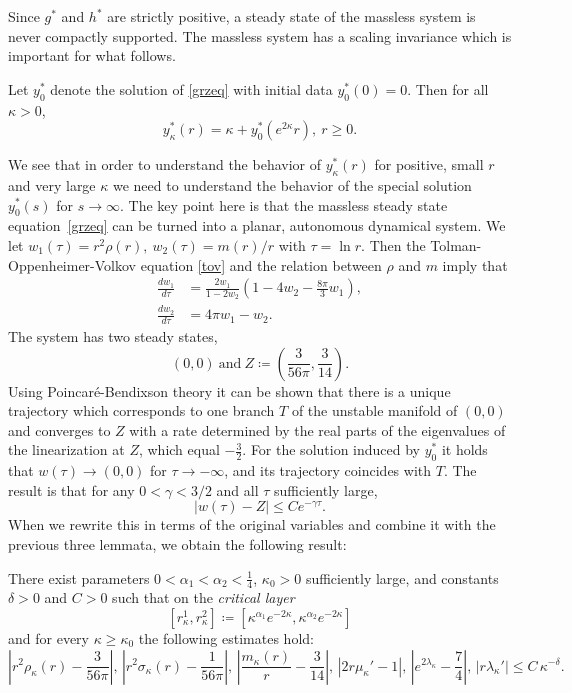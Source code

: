 \documentclass[11pt]{article}
\begin{document}
Since $g^\ast$ and $h^\ast$ are strictly positive,
a steady state of the massless system is never compactly supported.
The massless system has a scaling invariance which is important for
what follows.
%
\begin{lemma} \label{z-xi}
  Let $y^\ast_0$ denote the solution of \eqref{grzeq}
  with initial data $y^\ast_0(0)=0$.
  Then for all $\kappa >0$,
  \[
  y^\ast_\kappa(r) = \kappa + y^\ast_0(e^{2\kappa} r),\ r\geq 0 .
  \]
\end{lemma}
%
We see that in order to understand the behavior of $y^\ast_\kappa(r)$ for
positive, small $r$ and very large $\kappa$ we need to understand the behavior
of the special solution $y^\ast_0(s)$ for $s\to \infty$.
The key point here is that the massless steady state equation~\eqref{grzeq}
can be turned into a planar, autonomous dynamical system.
We let $w_1(\tau) = r^2 \rho(r),\ w_2(\tau)= m(r)/r$ with $\tau=\ln r$.
Then the Tolman-Oppenheimer-Volkov equation \eqref{tov} and the relation between
$\rho$ and $m$ imply that
\begin{align}
  \frac{d w_1}{d\tau}
  &=
  \frac{2 w_1}{1 - 2 w_2}\left(1 - 4 w_2 -\frac{8\pi}{3} w_1 \right),
  \label{w1}\\
  \frac{d w_2}{d\tau}
  &=
  4 \pi w_1 - w_2.\label{w2}
\end{align}
The system has two steady states,
\[
(0,0) \ \mbox{and}\
Z\coloneqq\left(\frac{3}{56\pi},\frac{3}{14}\right).
\]
Using Poincar\'{e}-Bendixson theory it can be shown that
there is a unique trajectory which corresponds to one branch $T$ of the unstable
manifold of $(0,0)$ and converges to $Z$ with a rate determined by
the real parts of the eigenvalues of the linearization at $Z$, which equal
$-\frac{3}{2}$.
For the solution induced by $y^\ast_0$ it holds that $w(\tau) \to (0,0)$ for
$\tau\to -\infty$, and its trajectory coincides with $T$.
The result is that
for any $0<\gamma < 3/2$ and all $\tau$ sufficiently large, 
\[
|w(\tau) - Z| \leq C e^{-\gamma \tau}.
\]
When we rewrite this in terms of the original variables and combine it with
the previous three lemmata, we obtain the following result: 
%
\begin{proposition}\label{P:EVTOBKZ}
  There exist parameters $0<\alpha_1 < \alpha_2 < \frac{1}{4}$, $\kappa_0>0$
  sufficiently large, and constants $\delta>0$ and $C>0$
  such that on the {\em critical layer}
  \[
  [r_\kappa^1, r_\kappa^2] \coloneqq
  [\kappa^{\alpha_1} e^{-2\kappa},\kappa^{\alpha_2} e^{-2\kappa}]
  \]
  and for every $\kappa\ge \kappa_0$
  the following estimates hold:
  \[
  \left|r^2 \rho_\kappa (r) - \frac{3}{56 \pi}\right|,\,
  \left|r^2 \sigma_\kappa (r) - \frac{1}{56 \pi}\right|,\,
  \left|\frac{m_\kappa(r)}{r} -\frac{3}{14}\right|,\,
  \left|2r\mu_\kappa'-1\right|,\,
  \left|e^{2\lambda_\kappa}-\frac{7}{4}\right|,\,  \left|r \lambda_\kappa'\right|
  \leq
  C\,\kappa^{-\delta}.
  \]
\end{proposition}
\end{document}
